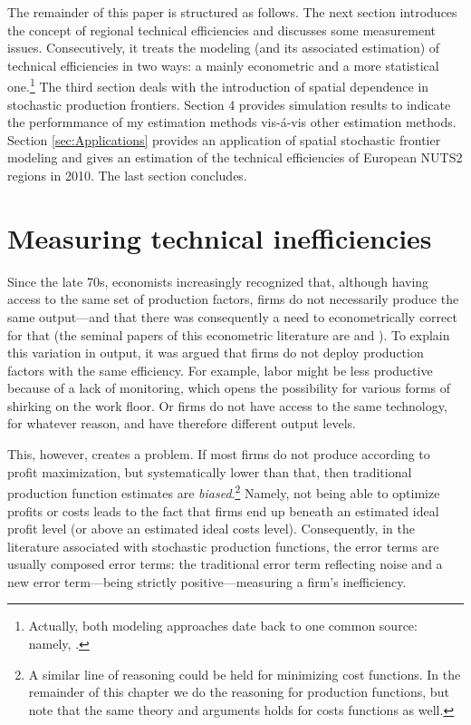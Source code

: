 \documentclass[11pt,parskip,abstracton,notitlepage]{scrartcl}
\begin{document}
The remainder of this paper is structured as follows. The next section
introduces the concept of regional technical efficiencies and discusses some
measurement issues. Consecutively, it treats the modeling (and its associated
estimation) of technical efficiencies in two ways: a mainly econometric and a
more statistical one.\footnote{Actually, both modeling approaches date back to
  one common source: namely, \cite{WEINSTEIN1964}.} The third section deals with
the introduction of spatial dependence in stochastic production frontiers.
Section 4 provides simulation results to indicate the performmance of my
estimation methods vis-\'{a}-vis other estimation methods. Section \ref{sec:Applications} provides an application of spatial stochastic frontier modeling and gives an estimation of the technical efficiencies of European NUTS2 regions in 2010. The last section concludes.
%
\section{Measuring technical inefficiencies}
%
Since the late 70s, economists increasingly recognized that, although having access to the same set of production factors, firms do not necessarily produce the same output---and that there was consequently a need to econometrically correct for that (the seminal papers of this econometric literature are \citet{AIGNER1977} and \citet{MEEUSEN1977}). To explain this variation in output, it was argued that firms do not deploy production factors with the same efficiency. For example, labor might be less productive because of a lack of monitoring, which opens the possibility for various forms of shirking on the work floor. Or firms do not have access to the same technology, for whatever reason, and have therefore different output levels.

This, however, creates a problem. If most firms do not produce according to profit maximization, but systematically lower than that, then traditional production function estimates are \emph{biased}.\footnote{A similar line of reasoning could be held for minimizing cost functions. In the remainder of this chapter we do the reasoning for production functions, but note that the same theory and arguments holds for costs functions as well.} Namely, not being able to optimize profits or costs leads to the fact that firms end up beneath an estimated ideal profit level (or above an estimated ideal costs level). Consequently, in the literature associated with stochastic production functions, the error terms are usually composed error terms: the traditional error term reflecting noise and a new error term---being strictly positive---measuring a firm's inefficiency.
\end{document}
